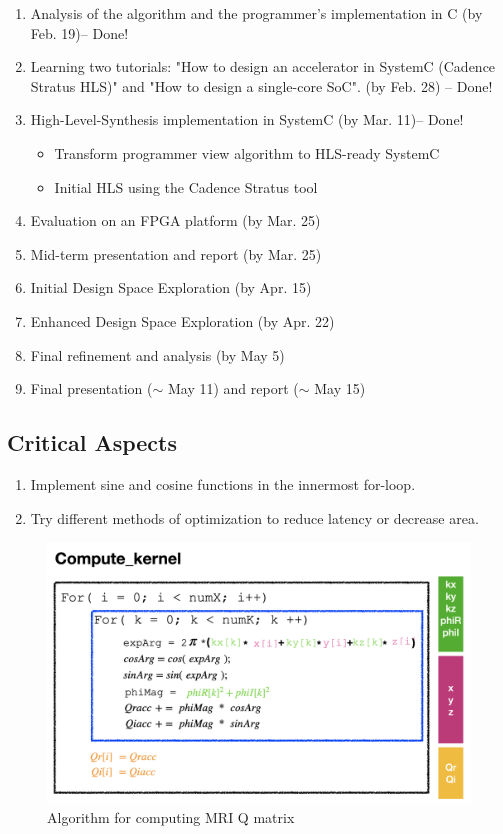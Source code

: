 \vspace{-0.1in}
\begin{enumerate}
\setlength\itemsep{-0.15em}
  \item Analysis of the algorithm and the programmer's implementation in C (by Feb. 19)-- Done!
  \item Learning two tutorials: "How to design an accelerator in SystemC (Cadence Stratus HLS)" and "How to design a single-core SoC"\cite{esp1}. (by Feb. 28) -- Done!
  \item High-Level-Synthesis implementation in SystemC (by Mar. 11)-- Done!
  \vspace{-2mm}
       \begin{itemize}
            \item Transform programmer view algorithm to HLS-ready SystemC
            \item Initial HLS using the Cadence Stratus tool
       \end{itemize}

  \item Evaluation on an FPGA platform (by Mar. 25)
  \item Mid-term presentation and report (by Mar. 25)
  \item Initial Design Space Exploration (by Apr. 15)
  \item Enhanced Design Space Exploration (by Apr. 22)
  \item Final refinement and analysis (by May 5)
  \item Final presentation ($\sim$ May 11) and report ($\sim$ May 15)
\end{enumerate}

\subsection{Critical Aspects}
\begin{enumerate}
\setlength\itemsep{-0.15em}
\item Implement sine and cosine functions in the innermost for-loop.
\item Try different methods of optimization to reduce latency or decrease area.
\end{enumerate}

\begin{figure}[t]
\centering
\captionsetup{justification=centering, format=hang}
\includegraphics[width=0.85\columnwidth]{figures/algorithm.png}
\caption{Algorithm for computing MRI Q matrix~\cite{stone2008accelerating}}
\label{fig-1}
\end{figure}
